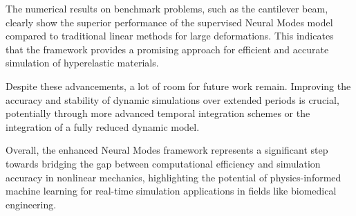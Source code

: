 \documentclass[11pt,a4paper,twocolumn]{article}
\begin{document}
The numerical results on benchmark problems, such as the cantilever beam, clearly show the superior performance of the supervised Neural Modes model compared to traditional linear methods for large deformations. This indicates that the framework provides a promising approach for efficient and accurate simulation of hyperelastic materials.

Despite these advancements, a lot of room for future work remain. Improving the accuracy and stability of dynamic simulations over extended periods is crucial, potentially through more advanced temporal integration schemes or the integration of a fully reduced dynamic model.  

Overall, the enhanced Neural Modes framework represents a significant step towards bridging the gap between computational efficiency and simulation accuracy in nonlinear mechanics, highlighting the potential of physics-informed machine learning for real-time simulation applications in fields like biomedical engineering.


\end{document}
